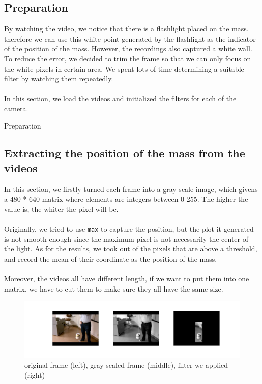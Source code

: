 \documentclass{article}
\begin{document}
\subsection{Preparation}
By watching the video, we notice that there is a flashlight placed on the mass, therefore we can use this white point generated by the flashlight as the indicator of the position of the mass. However, the recordings also captured a white wall. To reduce the error, we decided to trim the frame so that we can only focus on the white pixels in certain area. We spent lots of time determining a suitable filter by watching them repeatedly. \\
~\\
In this section, we load the videos and initialized the filters for each of the camera.
\begin{algorithm}
\begin{algorithmic}
\end{algorithmic}
\caption{Preparation}
\end{algorithm}


\subsection{Extracting the position of the mass from the videos}
In this section, we firstly turned each frame into a gray-scale image, which givens a 480 * 640 matrix where elements are integers between 0-255. The higher the value is, the whiter the pixel will be. \\
~\\
Originally, we tried to use \texttt{max} to capture the position, but the plot it generated is not smooth enough since the maximum pixel is not necessarily the center of the light. As for the results, we took out of the pixels that are above a threshold, and record the mean of their coordinate as the position of the mass. \\
~\\
Moreover, the videos all have different length, if we want to put them into one matrix, we have to cut them to make sure they all have the same size.\\
\begin{figure}[h]
    \centerline{\includegraphics[width=6in]{filter.jpg}}
    \caption{original frame (left), gray-scaled frame (middle), filter we applied (right)}
\end{figure}\\
\end{document}

